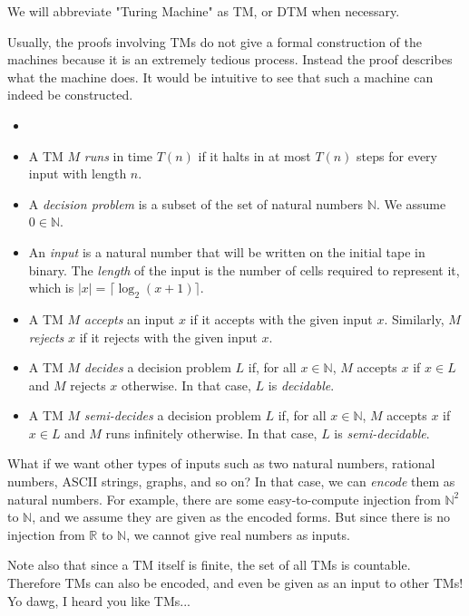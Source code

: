 	We will abbreviate "Turing Machine" as TM, or DTM when necessary.
	
	Usually, the proofs involving TMs do not give a formal construction of the machines because it is an extremely tedious process. Instead the proof describes what the machine does. It would be intuitive to see that such a machine can indeed be constructed.
	
	\begin{defn} \label{def_problem} \begin{itemize}
	    \item []
	    \item A TM $M$ \emph{runs} in time $T(n)$ if it halts in at most $T(n)$ steps for every input with length $n$.
	    \item A \emph{decision problem} is a subset of the set of natural numbers $\mathbb{N}$. We assume $0 \in \mathbb{N}$.
	    \item An \emph{input} is a natural number that will be written on the initial tape in binary. The \emph{length} of the input is the number of cells required to represent it, which is $|x| = \lceil \log_2 (x+1) \rceil$.
	    \item A TM $M$ \emph{accepts} an input $x$ if it accepts with the given input $x$. Similarly, $M$ \emph{rejects} $x$ if it rejects with the given input $x$.
	    \item A TM $M$ \emph{decides} a decision problem $L$ if, for all $x \in \mathbb{N}$, $M$ accepts $x$ if $x \in L$ and $M$ rejects $x$ otherwise. In that case, $L$ is \emph{decidable}.
	    \item A TM $M$ \emph{semi-decides} a decision problem $L$ if, for all $x \in \mathbb{N}$, $M$ accepts $x$ if $x \in L$ and $M$ runs infinitely otherwise. In that case, $L$ is \emph{semi-decidable}.
	\end{itemize} \end{defn}
	
	What if we want other types of inputs such as two natural numbers, rational numbers, ASCII strings, graphs, and so on? In that case, we can \emph{encode} them as natural numbers. For example, there are some easy-to-compute injection from $\mathbb{N}^2$ to $\mathbb{N}$, and we assume they are given as the encoded forms. But since there is no injection from $\mathbb{R}$ to $\mathbb{N}$, we cannot give real numbers as inputs.
	
	Note also that since a TM itself is finite, the set of all TMs is countable. Therefore TMs can also be encoded, and even be given as an input to other TMs! Yo dawg, I heard you like TMs...
	

